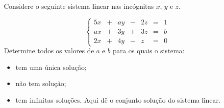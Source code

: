 \begin{problem} 
Considere o seguinte sistema linear nas incógnitas $x$, $y$ e $z$.

$$\left\{\begin{array}{rrrrrrr}
5x & + & ay & - &  2z & = &  1\\
ax & + & 3y & + &  3z & = &  b\\
2x & + & 4y & - &   z & = &  0
\end{array} \right.$$\noindent Determine todos os valores de $a$ e $b$ para os quais o sistema:
\begin{itemize}
\item[(a)] tem uma única solução;
\item[(b)] não tem solução;
\item[(c)] tem infinitas soluções. Aqui dê o conjunto solução do sistema linear.
\end{itemize}
\end{problem}
